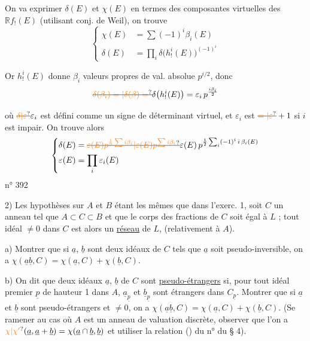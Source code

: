 On va exprimer $\delta(E)$ et $\chi(E)$ en termes des  composantes virtuelles des $\mathbb R f_!(E)$ (utilisant conj. de Weil), on trouve
\[
\left\{\begin{aligned}
\chi(E)&=\sum(-1)^i\beta_i(E)\\
\delta(E)&=\prod_i\delta\bigl(h^i_!(E)\bigr)^{(-1)^i}
\end{aligned}\right.
\]

Or $h^i_!(E)$ donne $\beta_i$ valeurs propres de val. absolue $p^{i/2}$, donc
\[
\deleted{\unsure{\delta(\beta_i)=|\delta(\beta)=}}\delta\bigl(h^i_!(E)\bigr)=\varepsilon_i\,p^{\frac{i\beta_i}{2}}
\]

où $\deleted{\unsure{\delta|\varepsilon}}\varepsilon_i$ est défini comme un signe de déterminant virtuel, et $\varepsilon_i$ est $\deleted{\unsure{=|\varepsilon}}+1$ si $i$ est impair. On trouve alors
\[
\left\{\begin{aligned}
\delta(E)&=\deleted{\unsure{\varepsilon(E)p^{\frac12\sum i\beta_i}|\varepsilon(E)p^{\sum i\beta_i}}}\varepsilon(E)\,p^{\frac12\sum_i(-1)^i\,i\,\beta_i(E)}\\
\varepsilon(E)&=\prod_i\varepsilon_i(E)
\end{aligned}\right.
\]
\hfill n° 392

2) Les hypothèses sur $A$ et $B$ étant les mêmes que dans l'exerc. 1, soit $C$ un anneau tel que $A\subset C\subset B$ et que le corps des fractions de $C$ soit égal à $L$ ; tout idéal $\ne0$ dans $C$ est alors un \uline{réseau} de $L$, (relativement à $A$).

a) Montrer que si $\underline a$, $\underline b$ sont deux idéaux de $C$ tels que $\underline a$ soit pseudo-inversible, on a $\chi(\underline a\underline b,C)=\chi(\underline a,C)+\chi(\underline b,C)$.

b) On dit que deux idéaux $\underline a$, $\underline b$ de $C$ sont \uline{pseudo-étrangers} si, pour tout idéal premier $\underline p$ de hauteur 1 dans $A$, $\underline a_{\underline p}$ et $\underline b_{\underline p}$ sont étrangers dans $C_{\underline p}$. Montrer que si $\underline a$ et $\underline b$ sont pseudo-étrangers et $\ne0$, on a $\chi(\underline a\underline b,C)=\chi(\underline a,C)+\chi(\underline b,C)$. (Se ramener au cas où $A$ est un anneau de valuation discrète, observer que l'on a $\unsure{\chi|\chi'}(\underline a,\underline a+\underline b)=\chi(\underline a\cap\underline b,\underline b)$ et utiliser la relation (\quad) du n° \quad du \S{} 4).


